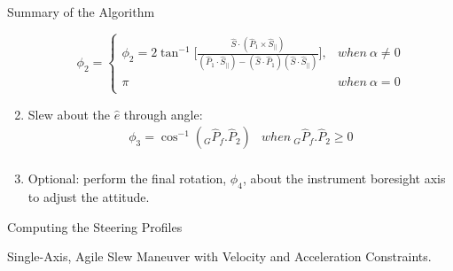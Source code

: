 \documentclass{beamer}
\begin{document}
\begin{frame}{Summary of the Algorithm}
\begin{block}{}
\begin{enumerate}
 \begin{equation}\label{phi2}
 \phi_2=\left\{
                \begin{array}{ll}
                \phi_2=2\tan^{-1}\Big[ \frac{\hat{S}\cdot (\hat{P}_1\times\hat{S}_{||})}{(\hat{P}_1\cdot\hat{S}_{||})-(\hat{S}\cdot\hat{P}_1)(\hat{S}\cdot\hat{S}_{||})}\Big],& {\scriptstyle when} \  \alpha\neq 0\\
                 \pi& {\scriptstyle when} \ \alpha=0\\
                \end{array}
              \right.
 \end{equation}
 \item Slew about the $\hat{e}$ through angle:
 \begin{equation}
	 \begin{array}{lr}
	 \phi_3 = \cos^{-1}(_G\hat{P}_f.\hat{P}_2) & {\scriptstyle when} \  _G\hat{P}_f.\hat{P}_2\geq 0\\
	 \end{array}
 \end{equation}
\item Optional: perform the final rotation, $\phi_4$, about the instrument boresight axis to adjust the attitude. 
\end{enumerate}
\end{block}
\end{frame}
%
%
%
%
\begin{frame}
\begin{block}{}
\begin{center}
{\LARGE{Computing the Steering Profiles}}
\begin{center}
 Single-Axis, Agile Slew Maneuver with Velocity and Acceleration Constraints.
\end{center}
\end{center}
\end{block}
\end{frame}
\end{document}
